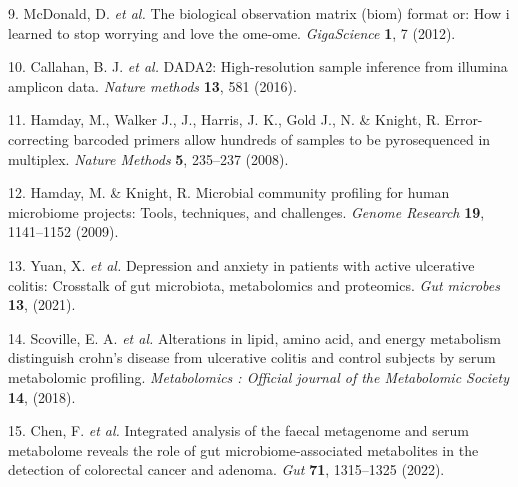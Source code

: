 \documentclass[
]{article}
\newenvironment{cslreferences}%
  {}%
  {\par}
\begin{document}
\begin{cslreferences}
\leavevmode\hypertarget{ref-TheBiologicalMcdona2012}{}%
9. McDonald, D. \emph{et al.} The biological observation matrix (biom) format or: How i learned to stop worrying and love the ome-ome. \emph{GigaScience} \textbf{1}, 7 (2012).

\leavevmode\hypertarget{ref-Dada2HighResCallah2016}{}%
10. Callahan, B. J. \emph{et al.} DADA2: High-resolution sample inference from illumina amplicon data. \emph{Nature methods} \textbf{13}, 581 (2016).

\leavevmode\hypertarget{ref-ErrorCorrectinHamday2008}{}%
11. Hamday, M., Walker J., J., Harris, J. K., Gold J., N. \& Knight, R. Error-correcting barcoded primers allow hundreds of samples to be pyrosequenced in multiplex. \emph{Nature Methods} \textbf{5}, 235--237 (2008).

\leavevmode\hypertarget{ref-MicrobialCommuHamday2009}{}%
12. Hamday, M. \& Knight, R. Microbial community profiling for human microbiome projects: Tools, techniques, and challenges. \emph{Genome Research} \textbf{19}, 1141--1152 (2009).

\leavevmode\hypertarget{ref-DepressionAndYuan2021}{}%
13. Yuan, X. \emph{et al.} Depression and anxiety in patients with active ulcerative colitis: Crosstalk of gut microbiota, metabolomics and proteomics. \emph{Gut microbes} \textbf{13}, (2021).

\leavevmode\hypertarget{ref-AlterationsInScovil2018}{}%
14. Scoville, E. A. \emph{et al.} Alterations in lipid, amino acid, and energy metabolism distinguish crohn's disease from ulcerative colitis and control subjects by serum metabolomic profiling. \emph{Metabolomics : Official journal of the Metabolomic Society} \textbf{14}, (2018).

\leavevmode\hypertarget{ref-IntegratedAnalChen2022}{}%
15. Chen, F. \emph{et al.} Integrated analysis of the faecal metagenome and serum metabolome reveals the role of gut microbiome-associated metabolites in the detection of colorectal cancer and adenoma. \emph{Gut} \textbf{71}, 1315--1325 (2022).
\end{cslreferences}
\end{document}

